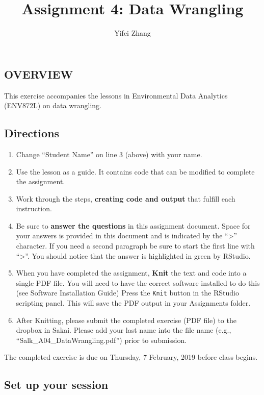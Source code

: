 \documentclass[]{article}
\title{Assignment 4: Data Wrangling}
\author{Yifei Zhang}
\date{}
\providecommand{\tightlist}{%
  \setlength{\itemsep}{0pt}\setlength{\parskip}{0pt}}
\begin{document}
\maketitle

\subsection{OVERVIEW}\label{overview}

This exercise accompanies the lessons in Environmental Data Analytics
(ENV872L) on data wrangling.

\subsection{Directions}\label{directions}

\begin{enumerate}
\def\labelenumi{\arabic{enumi}.}
\tightlist
\item
  Change ``Student Name'' on line 3 (above) with your name.
\item
  Use the lesson as a guide. It contains code that can be modified to
  complete the assignment.
\item
  Work through the steps, \textbf{creating code and output} that fulfill
  each instruction.
\item
  Be sure to \textbf{answer the questions} in this assignment document.
  Space for your answers is provided in this document and is indicated
  by the ``\textgreater{}'' character. If you need a second paragraph be
  sure to start the first line with ``\textgreater{}''. You should
  notice that the answer is highlighted in green by RStudio.
\item
  When you have completed the assignment, \textbf{Knit} the text and
  code into a single PDF file. You will need to have the correct
  software installed to do this (see Software Installation Guide) Press
  the \texttt{Knit} button in the RStudio scripting panel. This will
  save the PDF output in your Assignments folder.
\item
  After Knitting, please submit the completed exercise (PDF file) to the
  dropbox in Sakai. Please add your last name into the file name (e.g.,
  ``Salk\_A04\_DataWrangling.pdf'') prior to submission.
\end{enumerate}

The completed exercise is due on Thursday, 7 February, 2019 before class
begins.

\subsection{Set up your session}\label{set-up-your-session}
\end{document}
